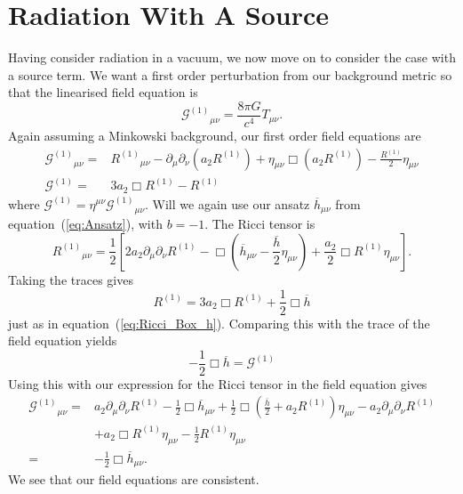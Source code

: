 \documentclass[a4paper, 11pt, titlepage, twoside]{report}
\newcommand{\eqnref}[1]{equation~(\ref{eq:#1})}
\newcommand{\recip}[1]{\ensuremath{\frac{1}{#1}}}
\begin{document}
\section{Radiation With A Source}

Having consider radiation in a vacuum, we now move on to consider the case with a source term. We want a first order perturbation from our background metric so that the linearised field equation is
\begin{equation}
{\mathcal{G}^{(1)}}_{\mu\nu} = \frac{8\pi G}{c^4}T_{\mu\nu}.
\end{equation}
Again assuming a Minkowski background, our first order field equations are
\begin{align}
{\mathcal{G}^{(1)}}_{\mu\nu} = {} & {R^{(1)}}_{\mu\nu} - \partial_\mu\partial_\nu(a_2 R^{(1)}) + \eta_{\mu\nu}\Box(a_2 R^{(1)}) - \frac{R^{(1)}}{2}\eta_{\mu\nu} \\
\mathcal{G}^{(1)} = {} & 3a_2 \Box R^{(1)} - R^{(1)}
\end{align}
where $\mathcal{G}^{(1)} = \eta^{\mu\nu}{\mathcal{G}^{(1)}}_{\mu\nu}$. Will we again use our ansatz $\overline{h}_{\mu\nu}$ from \eqnref{Ansatz}, with $b = -1$. The Ricci tensor is
\begin{equation}
{R^{(1)}}_{\mu\nu} = \frac{1}{2}\left[2 a_2 \partial_\mu\partial_\nu R^{(1)} - \Box\left(\overline{h}_{\mu\nu} -\frac{\overline{h}}{2}\eta_{\mu\nu}\right) + \frac{a_2}{2}\Box R^{(1)}\eta_{\mu\nu}\right].
\end{equation}
Taking the traces gives
\begin{equation}
R^{(1)} = 3a_2\Box R^{(1)} + \recip{2}\Box\overline{h}
\end{equation}
just as in \eqnref{Ricci_Box_h}. Comparing this with the trace of the field equation yields
\begin{equation}
-\recip{2}\Box\overline{h} = \mathcal{G}^{(1)}
\end{equation}
Using this with our expression for the Ricci tensor in the field equation gives
\begin{align}
{\mathcal{G}^{(1)}}_{\mu\nu} = {} & a_2\partial_\mu\partial_\nu R^{(1)} - \recip{2}\Box\overline{h}_{\mu\nu} + \recip{2}\Box\left(\frac{\overline{h}}{2} + a_2 R^{(1)}\right)\eta_{\mu\nu} - a_2\partial_\mu\partial_\nu R^{(1)} \nonumber \\
 & + {} a_2\Box R^{(1)} \eta_{\mu\nu} - \recip{2}R^{(1)}\eta_{\mu\nu} \nonumber \\
 = {} & - \recip{2}\Box\overline{h}_{\mu\nu}.
\end{align}
We see that our field equations are consistent.
\end{document}
